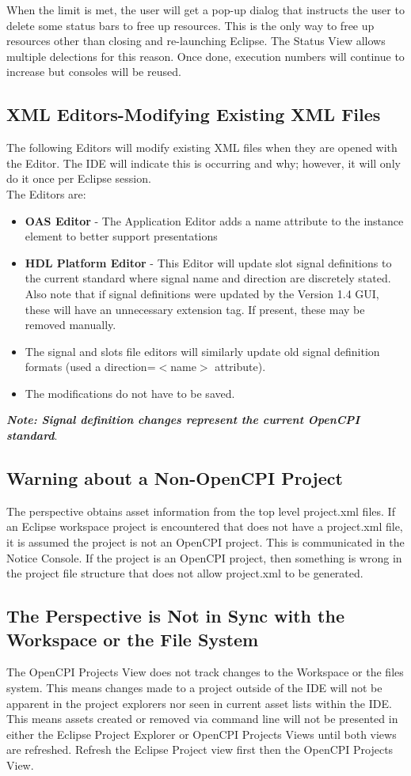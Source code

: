 \documentclass[10pt, a4paper, oneside]{article}
\begin{document}
When the limit is met, the user will get a pop-up dialog that instructs the user to delete some status bars to free up resources. This is the only way to free up resources other than closing and re-launching Eclipse. The Status View allows multiple delections for this reason. Once done, execution numbers will continue to increase but consoles will be reused.

\subsection{XML Editors-Modifying Existing XML Files}
The following Editors will modify existing XML files when they are opened with the Editor. The IDE will indicate this is occurring and why; however, it will only do it once per Eclipse session.\\
The Editors are:
\begin{itemize}
\item	\textbf{OAS Editor} - The Application Editor adds a name attribute to the instance element to better support presentations
\item	\textbf{HDL Platform Editor} - This Editor will update slot signal definitions to the current standard where signal name and direction are discretely stated. Also note that if signal definitions were updated by the Version 1.4 GUI, these will have an unnecessary extension tag. If present, these may be removed manually.
\item	[]The signal and slots file editors will similarly update old signal definition formats (used a direction=$<$name$>$ attribute).
\item [] The modifications do not have to be saved.\
\end{itemize}
\textbf{\emph{Note: Signal definition changes represent the current OpenCPI standard}}.
\subsection {Warning about a Non-OpenCPI Project}
The perspective obtains asset information from the top level project.xml files. If an Eclipse workspace project is encountered that does not have a project.xml file, it is assumed the project is not an OpenCPI project. This is communicated in the Notice Console. If the project is an OpenCPI project, then something is wrong in the project file structure that does not allow project.xml to be generated.
\subsection{The Perspective is Not in Sync with the Workspace or the File System}
The OpenCPI Projects View does not track changes to the Workspace or the files system. This means changes made to a project outside of the IDE will not be apparent in the project explorers nor seen in current asset lists within the IDE. This means assets created or removed via command line will not be presented in either the Eclipse Project Explorer or OpenCPI Projects Views until both views are refreshed. Refresh the Eclipse Project view first then the OpenCPI Projects View.\\
\end{document}
